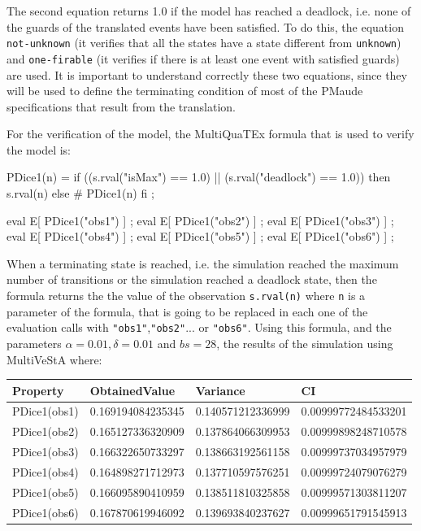 The second equation returns 1.0 if the model has reached a deadlock, i.e. none of the guards of the translated events have been satisfied. To do this, the equation \texttt{not-unknown} (it verifies that all the states have a state different from \texttt{unknown}) and \texttt{one-firable} (it verifies if there is at least one event with satisfied guards) are used. It is important to understand correctly these two equations, since they will be used to define the terminating condition of most of the PMaude specifications that result from the translation. 

For the verification of the model, the MultiQuaTEx formula that is used to verify the model is:
\begin{maude2}

PDice1(n) = if ((s.rval("isMax") == 1.0) || (s.rval("deadlock") == 1.0)) 
            then s.rval(n) else # PDice1(n) fi ;

eval E[ PDice1("obs1") ] ;
eval E[ PDice1("obs2") ] ;
eval E[ PDice1("obs3") ] ;
eval E[ PDice1("obs4") ] ;
eval E[ PDice1("obs5") ] ;
eval E[ PDice1("obs6") ] ;
\end{maude2}
When a terminating state is reached, i.e. the simulation reached the maximum number of transitions or the simulation reached a deadlock state, then the formula returns the the value of the observation \texttt{s.rval(n)} where \texttt{n} is a parameter of the formula, that is going to be replaced in each one of the evaluation calls with \texttt{"obs1"},\texttt{"obs2"}... or \texttt{"obs6"}. Using this formula, and the parameters $\alpha = 0.01, \delta = 0.01$ and $bs = 28$, the results of the simulation using MultiVeStA where:
\begin{table}[H]
\centering
\begin{tabular}{|l|l|l|l|}
\hline
Property     & ObtainedValue     & Variance          & CI                  \\ \hline
PDice1(obs1) & 0.169194084235345 & 0.140571212336999 & 0.00999772484533201 \\ \hline
PDice1(obs2) & 0.165127336320909 & 0.137864066309953 & 0.00999898248710578 \\ \hline
PDice1(obs3) & 0.166322650733297 & 0.138663192561158 & 0.00999737034957979 \\ \hline
PDice1(obs4) & 0.164898271712973 & 0.137710597576251 & 0.00999724079076279 \\ \hline
PDice1(obs5) & 0.166095890410959 & 0.138511810325858 & 0.00999571303811207 \\ \hline
PDice1(obs6) & 0.167870619946092 & 0.139693840237627 & 0.00999651791545913 \\ \hline
\end{tabular}
\end{table}

